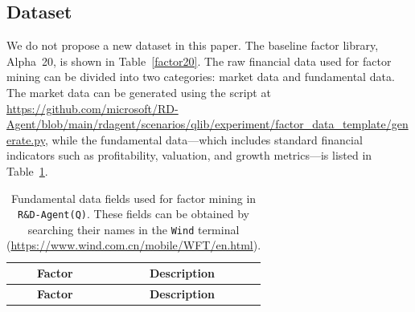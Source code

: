 \documentclass{article}
\newcommand{\name}{\texttt{R\&D-Agent(Q)}}
\begin{document}
\subsection{Dataset}
\label{app:dataset}
We do not propose a new dataset in this paper. The baseline factor library, Alpha~20, is shown in Table~\ref{factor20}.
The raw financial data used for factor mining can be divided into two categories: market data and fundamental data. 
The market data can be generated using the script at \url{https://github.com/microsoft/RD-Agent/blob/main/rdagent/scenarios/qlib/experiment/factor_data_template/generate.py}, while the fundamental data—which includes standard financial indicators such as profitability, valuation, and growth metrics—is listed in Table~\ref{factor_fundamental}.


\begin{longtable}{@{}ll@{}}
\caption{Fundamental data fields used for factor mining in \texttt{\name}. These fields can be obtained by searching their names in the \texttt{Wind} terminal (\url{https://www.wind.com.cn/mobile/WFT/en.html}).} \label{factor_fundamental} \\
\toprule
\multicolumn{1}{c}{\textbf{Factor}} & \multicolumn{1}{c}{\textbf{Description}} \\
\midrule
\endfirsthead

\toprule
\multicolumn{1}{c}{\textbf{Factor}} & \multicolumn{1}{c}{\textbf{Description}} \\
\midrule
\endhead


\end{longtable}
\end{document}
